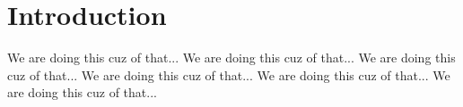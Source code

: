 \section{Introduction}
We are doing this cuz of that...
We are doing this cuz of that...
We are doing this cuz of that...
We are doing this cuz of that...
We are doing this cuz of that...
We are doing this cuz of that...